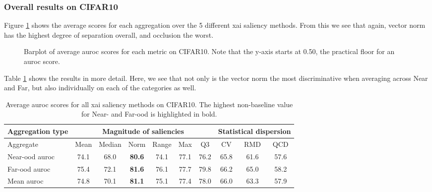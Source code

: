\documentclass[UKenglish]{uiomasterthesis} %
\theoremstyle{definition}
\begin{document}
\subsubsection{Overall results on CIFAR10} \label{section:salagg_val_cifar10}

Figure \ref{fig:cifar10_all_metrics_barplot} shows the average scores for each aggregation over the 5 different \ac{xai} saliency methods. From this we see that again, vector norm has the highest degree of separation overall, and occlusion the worst. 

\begin{figure}[H]
    \begin{center}
        
    \end{center}
    \caption[Average AUROC scores for magnitude aggregations on CIFAR10]{Barplot of average \ac{auroc} scores for each metric on CIFAR10. Note that the y-axis starts at 0.50, the practical floor for an \ac{auroc} score.}
    \label{fig:cifar10_all_metrics_barplot}
\end{figure}

Table \ref{table:cifar10_all_metrics} shows the results in more detail. Here, we see that not only is the vector norm the most discriminative when averaging across Near and Far, but also individually on each of the categories as well.

\begin{table}[H]
\setlength\tabcolsep{3pt}
\begin{center}
\begin{tabular}{ |p{5.1em}|c c c c c c|c c c| }
    \hline
     \centering Aggregation type & \multicolumn{6}{c|}{Magnitude of saliencies} & \multicolumn{3}{p{8em}|}{\centering Statistical dispersion} \\
    \hline
    Aggregate & Mean & Median & Norm & Range & Max & Q3 & CV & RMD & QCD  \\
    \hline
    \rowcolor{near!50}
    Near-\ac{ood} \ac{auroc} & 74.1 & 68.0 &\textbf{ 80.6 }& 74.1 & 77.1 & 76.2 & 65.8 & 61.6 & 57.6  \\
    \hline
    \rowcolor{far!50}
    Far-\ac{ood} \ac{auroc} & 75.4 & 72.1 &\textbf{ 81.6 }& 76.1 & 77.7 & 79.8 & 66.2 & 65.0 & 58.2  \\
    \hline
    Mean \ac{auroc} & 74.8 & 70.1 &\textbf{ 81.1 }& 75.1 & 77.4 & 78.0 & 66.0 & 63.3 & 57.9  \\
    \hline
    \end{tabular}
    \caption[Average \ac{auroc} scores over all \ac{xai} saliency methods on CIFAR10]{Average \ac{auroc} scores for all \ac{xai} saliency methods on CIFAR10. The highest non-baseline value for Near- and Far-\ac{ood} is highlighted in bold. }
    \label{table:cifar10_all_metrics}
\end{center}
\setlength\tabcolsep{6pt}
\end{table}
\end{document}
